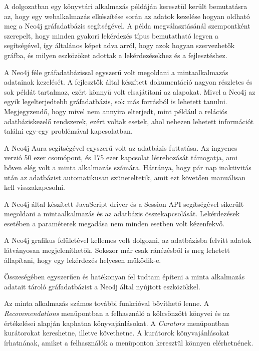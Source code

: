 
A dolgozatban egy könyvtári alkalmazás példáján keresztül került bemutatásra az, hogy egy webalkalmazás elkészítése során az adatok kezelése hogyan oldható meg a Neo4j gráfadatbázis segítségével.
A példa megválasztásánál szempontként szerepelt, hogy minden gyakori lekérdezés típus bemutatható legyen a segítségével, így általános képet adva arról, hogy azok hogyan szervezhetők gráfba, és milyen eszközöket adottak a lekérdezésekhez és a fejlesztéshez.

A Neo4j féle gráfadatbázissal egyszerű volt megoldani a mintaalkalmazás adatainak kezelését. A fejlesztők által készített dokumentáció nagyon részletes és sok példát tartalmaz, ezért könnyű volt elsajátítani az alapokat. Mivel a Neo4j az egyik legelterjedtebb gráfadatbázis, sok más forrásból is lehetett tanulni. Megjegyzendő, hogy mivel nem annyira elterjedt, mint például a relációs adatbáziskezelő rendszerek, ezért voltak esetek, ahol nehezen lehetett információt találni egy-egy problémával kapcsolatban. 

A Neo4j Aura segítségével egyszerű volt az adatbázis futtatása. Az ingyenes verzió 50 ezer csomópont, és 175 ezer kapcsolat létrehozását támogatja, ami bőven elég volt a minta alkalmazás számára. Hátránya, hogy pár nap inaktivitás után az adatbázist automatikusan szüneteltetik, amit ezt követően manuálisan kell visszakapcsolni.

A Neo4j által készített JavaScript driver és a Session API segítségével sikerült megoldani a mintaalkalmazás és az adatbázis összekapcsolását. Lekérdezések esetében a paraméterek megadása nem minden esetben volt kézenfekvő.

A Neo4j grafikus felületével kellemes volt dolgozni, az adatbázisba felvitt adatok látványosan megjeleníthetők. Sokszor már csak ránézésből is meg lehetett állapítani, hogy egy lekérdezés helyesen működik-e.

Összeségében egyszerűen és hatékonyan fel tudtam építeni a minta alkalmazás adatait tároló gráfadatbázist a Neo4j által nyújtott eszközökkel.

Az minta alkalmazás számos további funkcióval bővíthető lenne. A \textit{Recommendations} menüpontban a felhasználó a kölcsönzött könyvei és az értékelései alapján kaphatna könyvajánlásokat. A \textit{Curators} menüpontban kurátorokat kereshetne, illetve követhetne. A kurátorok könyvajánlásokat írhatnának, amiket a felhasználók a menüponton keresztül könnyen elérhetnének.
